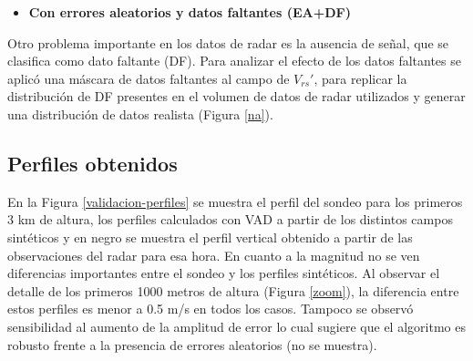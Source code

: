 \documentclass[12pt,spanish,oneside, a4paper]{book}
\providecommand{\tightlist}{%
  \setlength{\itemsep}{0pt}\setlength{\parskip}{0pt}}
\begin{document}
\begin{itemize}
\tightlist
\item
  \textbf{Con errores aleatorios y datos faltantes (EA+DF)}
\end{itemize}

Otro problema importante en los datos de radar es la ausencia de señal,
que se clasifica como dato faltante (DF). Para analizar el efecto de los
datos faltantes se aplicó una máscara de datos faltantes al campo de
\(V_{rs}'\), para replicar la distribución de DF presentes en el volumen
de datos de radar utilizados y generar una distribución de datos
realista (Figura \ref{na}).

\subsection{Perfiles obtenidos}\label{perfiles-obtenidos}

En la Figura \ref{validacion-perfiles} se muestra el perfil del sondeo
para los primeros 3 km de altura, los perfiles calculados con VAD a
partir de los distintos campos sintéticos y en negro se muestra el
perfil vertical obtenido a partir de las observaciones del radar para
esa hora. En cuanto a la magnitud no se ven diferencias importantes
entre el sondeo y los perfiles sintéticos. Al observar el detalle de los
primeros 1000 metros de altura (Figura \ref{zoom}), la diferencia entre
estos perfiles es menor a 0.5 m/s en todos los casos. Tampoco se observó
sensibilidad al aumento de la amplitud de error lo cual sugiere que el
algoritmo es robusto frente a la presencia de errores aleatorios (no se
muestra).
\end{document}
